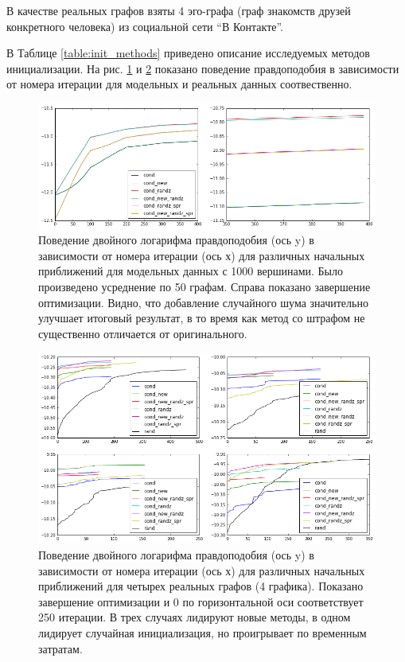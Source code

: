 \documentclass{ITaSconf}
\begin{document}
В качестве реальных графов взяты 4 эго-графа (граф знакомств друзей конкретного человека) из социальной сети ``В Контакте''.

В Таблице \ref{table:init_methods} приведено описание исследуемых методов инициализации.
На рис. \ref{fig:llh_init_model} и \ref{fig:llh_init_real} показано поведение правдоподобия в зависимости от номера итерации для модельных и реальных данных соотвественно.
 
\begin{figure}[!h]
	\centering
	\includegraphics[width=\linewidth]{imgs/init_new_good.png}
	\caption{Поведение двойного логарифма правдоподобия (ось y) в зависимости от номера итерации (ось х) для различных начальных приближений для модельных данных \cite{lancichinetti2009benchmarks} с 1000 вершинами. Было произведено усреднение по 50 графам. Справа показано завершение оптимизации. Видно, что добавление случайного шума значительно улучшает итоговый результат, в то время как метод со штрафом не существенно отличается от оригинального.}
	\label{fig:llh_init_model}
\end{figure}
\begin{figure}[!h]
	\centering
	\includegraphics[width=\linewidth]{imgs/init_llh_real.png}
	\caption{Поведение двойного логарифма правдоподобия (ось y) в зависимости от номера итерации (ось х) для различных начальных приближений для четырех реальных графов (4 графика). Показано завершение оптимизации и 0 по горизонтальной оси соответствует 250 итерации. В трех случаях лидируют новые методы, в одном лидирует случайная инициализация, но проигрывает по временным затратам. }
	\label{fig:llh_init_real}
\end{figure}
\end{document}
